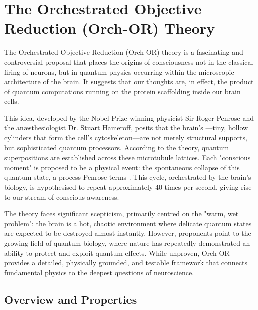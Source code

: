 
\chapter{The Orchestrated Objective Reduction (Orch-OR) Theory}
\label{ch:orch-or}

\begin{nontechnical}
    The Orchestrated Objective Reduction (Orch-OR) theory is a fascinating and controversial proposal that places the origins of consciousness not in the classical firing of neurons, but in quantum physics occurring within the microscopic architecture of the brain. It suggests that our thoughts are, in effect, the product of quantum computations running on the protein scaffolding inside our brain cells.

    This idea, developed by the Nobel Prize-winning physicist Sir Roger Penrose and the anæsthesiologist Dr. Stuart Hameroff, posits that the brain's —tiny, hollow cylinders that form the cell's cytoskeleton—are not merely structural supports, but sophisticated quantum processors. According to the theory, quantum superpositions are established across these microtubule lattices. Each "conscious moment" is proposed to be a physical event: the spontaneous collapse of this quantum state, a process Penrose terms . This cycle, orchestrated by the brain's biology, is hypothesised to repeat approximately 40 times per second, giving rise to our stream of conscious awareness.

    The theory faces significant scepticism, primarily centred on the "warm, wet problem": the brain is a hot, chaotic environment where delicate quantum states are expected to be destroyed almost instantly. However, proponents point to the growing field of quantum biology, where nature has repeatedly demonstrated an ability to protect and exploit quantum effects. While unproven, Orch-OR provides a detailed, physically grounded, and testable framework that connects fundamental physics to the deepest questions of neuroscience.
\end{nontechnical}

\section{Overview and Properties}

